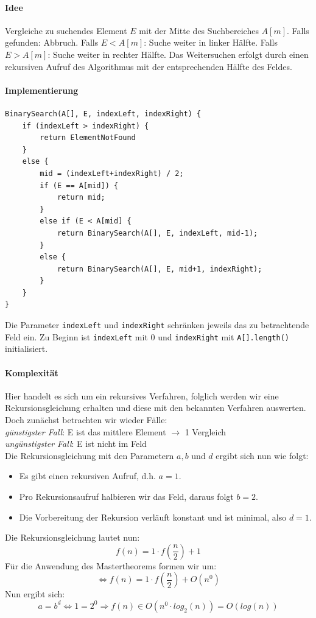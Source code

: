 \documentclass[11pt,a4paper]{scrartcl}
\begin{document}
\paragraph{Idee} Vergleiche zu suchendes Element $E$ mit der Mitte des Suchbereiches $A[m]$. Falls gefunden: Abbruch. Falls $E < A[m]$: Suche weiter in linker Hälfte. Falls $E > A[m]$: Suche weiter in rechter Hälfte. Das Weitersuchen erfolgt durch einen rekursiven Aufruf des Algorithmus mit der entsprechenden Hälfte des Feldes.
\paragraph{Implementierung}
\begin{lstlisting}
BinarySearch(A[], E, indexLeft, indexRight) {
	if (indexLeft > indexRight) {
		return ElementNotFound	
	}
	else {
		mid = (indexLeft+indexRight) / 2;
		if (E == A[mid]) {
			return mid;		
		}
		else if (E < A[mid] {
			return BinarySearch(A[], E, indexLeft, mid-1);	
		}
		else {
			return BinarySearch(A[], E, mid+1, indexRight);	
		}
	}
}
\end{lstlisting} 
Die Parameter \texttt{indexLeft} und \texttt{indexRight} schränken jeweils das zu betrachtende Feld ein. Zu Beginn ist \texttt{indexLeft} mit $0$ und \texttt{indexRight} mit \texttt{A[].length()} initialisiert. 
\paragraph{Komplexität}
Hier handelt es sich um ein rekursives Verfahren, folglich werden wir eine Rekursionsgleichung erhalten und diese mit den bekannten Verfahren auswerten. Doch zunächst betrachten wir wieder Fälle: \\
\textit{günstigster Fall}: \quad E ist das mittlere Element $\to$ 1 Vergleich\\
\textit{ungünstigster Fall}: \quad E ist nicht im Feld \\
Die Rekursionsgleichung mit den Parametern $a, b \text{ und } d$ ergibt sich nun wie folgt:
\begin{itemize}
\item Es gibt einen rekursiven Aufruf, d.h. $a = 1$.
\item Pro Rekursionsaufruf halbieren wir das Feld, daraus folgt $b = 2$.
\item Die Vorbereitung der Rekursion verläuft konstant und ist minimal, also $d = 1$.
\end{itemize}
Die Rekursionsgleichung lautet nun: 
\[f(n) = 1 \cdot f(\frac{n}{2}) + 1\]
Für die Anwendung des Mastertheorems formen wir um:
\[\iff f(n) = 1 \cdot f(\frac{n}{2}) + O(n^{0})\]
Nun ergibt sich: 
\[a = b^{d} \iff 1 = 2^{0} \Rightarrow f(n) \in O(n^{0} \cdot log_{2}(n)) = O(log(n))\]
\end{document}
